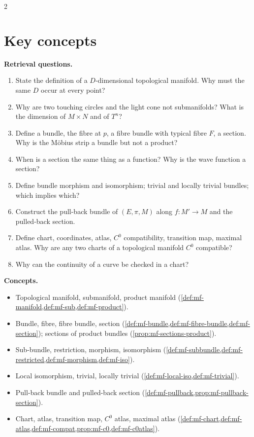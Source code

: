 \begin{paracol}{2}
\section*{Key concepts}
\begin{keyconcepts}
\textbf{Retrieval questions.}
\begin{enumerate}
  \item State the definition of a $D$-dimensional topological manifold. Why must the same $D$ occur at every point?
  \item Why are two touching circles and the light cone not submanifolds? What is the dimension of $M\times N$ and of $T^n$?
  \item Define a bundle, the fibre at $p$, a fibre bundle with typical fibre $F$, a section. Why is the Möbius strip a bundle but not a product?
  \item When is a section the same thing as a function? Why is the wave function a section?
  \item Define bundle morphism and isomorphism; trivial and locally trivial bundles; which implies which?
  \item Construct the pull-back bundle of $(E,\pi,M)$ along $f\colon M'\to M$ and the pulled-back section.
  \item Define chart, coordinates, atlas, $C^0$ compatibility, transition map, maximal atlas. Why are any two charts of a topological manifold $C^0$ compatible?
  \item Why can the continuity of a curve be checked in a chart?
\end{enumerate}
\textbf{Concepts.}
\begin{itemize}
  \item Topological manifold, submanifold, product manifold (\cref{def:mf-manifold,def:mf-sub,def:mf-product}).
  \item Bundle, fibre, fibre bundle, section (\cref{def:mf-bundle,def:mf-fibre-bundle,def:mf-section}); sections of product bundles (\cref{prop:mf-sections-product}).
  \item Sub-bundle, restriction, morphism, isomorphism (\cref{def:mf-subbundle,def:mf-restricted,def:mf-morphism,def:mf-iso}).
  \item Local isomorphism, trivial, locally trivial (\cref{def:mf-local-iso,def:mf-trivial}).
  \item Pull-back bundle and pulled-back section (\cref{def:mf-pullback,prop:mf-pullback-section}).
  \item Chart, atlas, transition map, $C^0$ atlas, maximal atlas (\cref{def:mf-chart,def:mf-atlas,def:mf-compat,prop:mf-c0,def:mf-c0atlas}).
\end{itemize}
\end{keyconcepts}

\flushside
\end{paracol}
